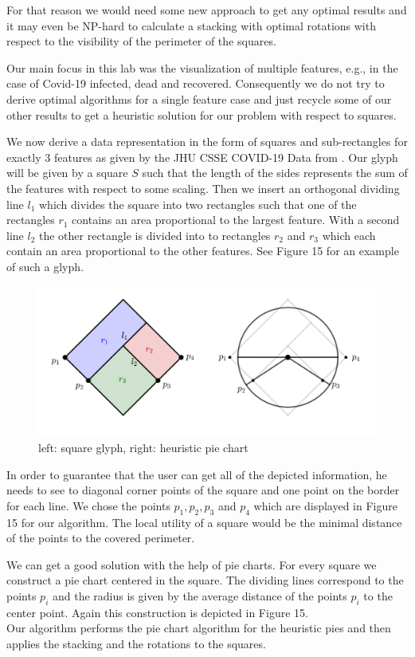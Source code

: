\documentclass[a4paper,11pt]{article}
\begin{document}
For that reason we would need some new approach to get any optimal results and it may even be NP-hard to calculate a stacking with optimal rotations with respect to the visibility of the perimeter of the squares.

Our main focus in this lab was the visualization of multiple features, e.g., in the case of Covid-19 infected, dead and recovered. Consequently we do not try to derive optimal algorithms for a single feature case and just recycle some of our other results to get a heuristic solution for our problem with respect to squares.



We now derive a data representation in the form of squares and sub-rectangles for exactly $3$ features as given by the JHU CSSE COVID-19 Data from \cite{data}. Our glyph will be given by a square $S$ such that the length of the sides represents the sum of the features with respect to some scaling. Then we insert an orthogonal dividing line $l_1$ which divides the square into two rectangles such that one of the rectangles $r_1$ contains an area proportional to the largest feature. With a second line $l_2$ the other rectangle is divided into to rectangles $r_2$ and $r_3$ which each contain an area proportional to the other features. See Figure 15 for an example of such a glyph.
\begin{figure}[t]
  \centering
  \includegraphics[height=5cm]{assets/square_glyphs}
  \caption{left: square glyph, right: heuristic pie chart}
\end{figure}


In order to guarantee that the user can get all of the depicted information, he needs to see to diagonal corner points of the square and one point on the border for each line. We chose the points $p_1,p_2,p_3$ and $p_4$ which are displayed in Figure 15 for our algorithm. The local utility of a square would be the minimal distance of the points to the covered perimeter.

We can get a good solution with the help of pie charts. For every square we construct a pie chart centered in the square. The dividing lines correspond to the points $p_i$ and the radius is given by the average distance of the points $p_i$ to the center point. Again this construction is depicted in Figure 15.
\\Our algorithm performs the pie chart algorithm for the heuristic pies and then applies the stacking and the rotations to the squares.
\end{document}
